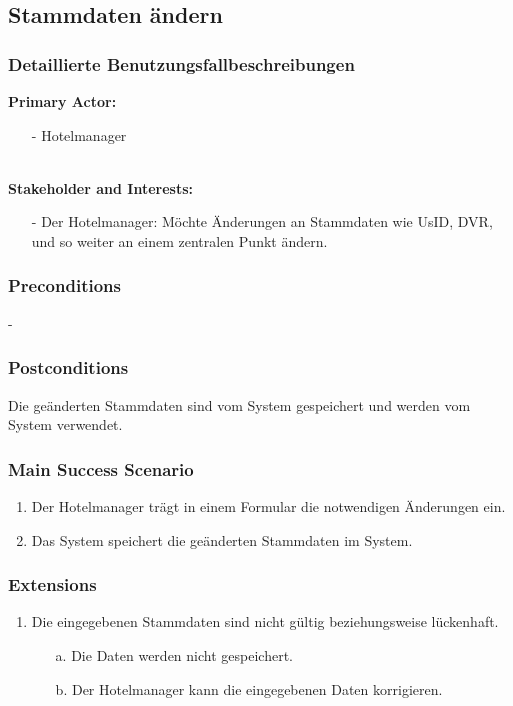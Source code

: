 \documentclass[./detailed_overview_usecases.tex]{subfiles}
\begin{document}
    \newpage
    \subsection{Stammdaten ändern}
    \subsubsection{Detaillierte Benutzungsfallbeschreibungen}
    \textbf{Primary Actor:}
    \begin{itemize}
        \item[-] Hotelmanager
    \end{itemize}
    \\
    \textbf{Stakeholder and Interests:}
    \begin{itemize}
        \item[-] Der Hotelmanager: Möchte Änderungen an Stammdaten wie UsID, DVR, und so weiter an  einem zentralen Punkt ändern.
    \end{itemize}

    \subsubsection*{Preconditions}
    -
    \subsubsection*{Postconditions}
    Die geänderten Stammdaten sind vom System gespeichert und werden vom System verwendet.

    \subsubsection*{Main Success Scenario}
    \begin{enumerate}
        \item Der Hotelmanager trägt in einem Formular die notwendigen Änderungen ein.
        \item Das System speichert die geänderten Stammdaten im System.
    \end{enumerate}

    \subsubsection*{Extensions}
    \begin{enumerate}
        \item Die eingegebenen Stammdaten sind nicht gültig beziehungsweise lückenhaft.
        \begin{itemize}
            \item[a.] Die Daten werden nicht gespeichert.
            \item[b.] Der Hotelmanager kann die eingegebenen Daten korrigieren.
        \end{itemize}
    \end{enumerate}
\end{document}
